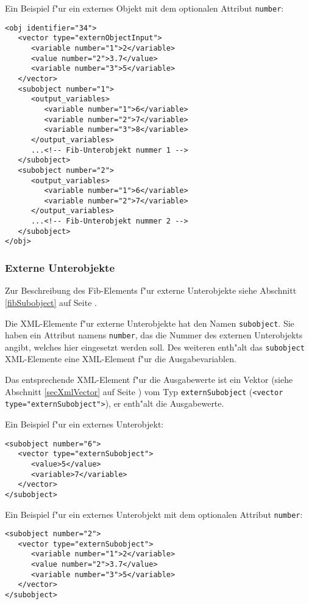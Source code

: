 \noindent
Ein Beispiel f"ur ein externes Objekt mit dem optionalen Attribut \verb|number|:
\begin{verbatim}
<obj identifier="34">
   <vector type="externObjectInput">
      <variable number="1">2</variable>
      <value number="2">3.7</value>
      <variable number="3">5</variable>
   </vector>
   <subobject number="1">
      <output_variables>
         <variable number="1">6</variable>
         <variable number="2">7</variable>
         <variable number="3">8</variable>
      </output_variables>
      ...<!-- Fib-Unterobjekt nummer 1 -->
   </subobject>
   <subobject number="2">
      <output_variables>
         <variable number="1">6</variable>
         <variable number="2">7</variable>
      </output_variables>
      ...<!-- Fib-Unterobjekt nummer 2 -->
   </subobject>
</obj>
\end{verbatim}



\subsubsection{Externe Unterobjekte}

Zur Beschreibung des Fib-Elements f"ur externe Unterobjekte siehe Abschnitt \ref{fibSubobject} auf Seite \pageref{fibSubobject} .

Die XML-Elemente f"ur externe Unterobjekte hat den Namen \verb|subobject|. Sie haben ein Attribut namens \verb|number|, das die Nummer des externen Unterobjekts angibt, welches hier eingesetzt werden soll. Des weiteren enth"alt das \verb|subobject| XML-Elemente eine XML-Element f"ur die Ausgabevariablen.

Das entsprechende XML-Element f"ur die Ausgabewerte ist ein Vektor (siehe Abschnitt \ref{secXmlVector} auf Seite \pageref{secXmlVector}) vom Typ \verb|externSubobject| (\verb|<vector| \verb| type=|\verb|"externSubobject">|), er enth"alt die Ausgabewerte.

\bigskip\noindent
Ein Beispiel f"ur ein externes Unterobjekt:
\begin{verbatim}
<subobject number="6">
   <vector type="externSubobject">
      <value>5</value>
      <variable>7</variable>
   </vector>
</subobject>
\end{verbatim}

\noindent
Ein Beispiel f"ur ein externes Unterobjekt mit dem optionalen Attribut \verb|number|:
\begin{verbatim}
<subobject number="2">
   <vector type="externSubobject">
      <variable number="1">2</variable>
      <value number="2">3.7</value>
      <variable number="3">5</variable>
   </vector>
</subobject>
\end{verbatim}

